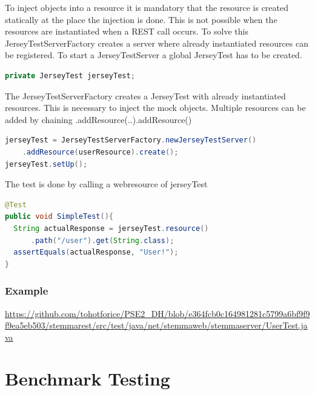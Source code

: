 \documentclass[11pt,fleqn,openany]{book} %
\begin{document}
To inject objects into a resource it is mandatory that the resource is created statically at the place the injection is done. This is not possible when the resources are instantiated when a REST call occurs. To solve this JerseyTestServerFactory creates a server where already instantiated resources can be registered. 
To start a JerseyTestServer a global JerseyTest has to be created.
\begin{lstlisting}[language=java]
private JerseyTest jerseyTest;
\end{lstlisting}
The JerseyTestServerFactory creates a JerseyTest with already instantiated resources. This is necessary to inject the mock objects. Multiple resources can be added by chaining .addResource(..).addResource()
\begin{lstlisting}[language=java]
jerseyTest = JerseyTestServerFactory.newJerseyTestServer()
	.addResource(userResource).create();
jerseyTest.setUp();
\end{lstlisting}

The test is done by calling a webresource of jerseyTest
\begin{lstlisting}[language=java]
@Test
public void SimpleTest(){
  String actualResponse = jerseyTest.resource()
      .path("/user").get(String.class);
  assertEquals(actualResponse, "User!");
}
\end{lstlisting}

\subsection*{Example}
\url{https://github.com/tohotforice/PSE2_DH/blob/e364fcb0c164981281c5799a6bf9f9f9ea5eb503/stemmarest/src/test/java/net/stemmaweb/stemmaserver/UserTest.java}



\chapter{Benchmark Testing}
\end{document}
